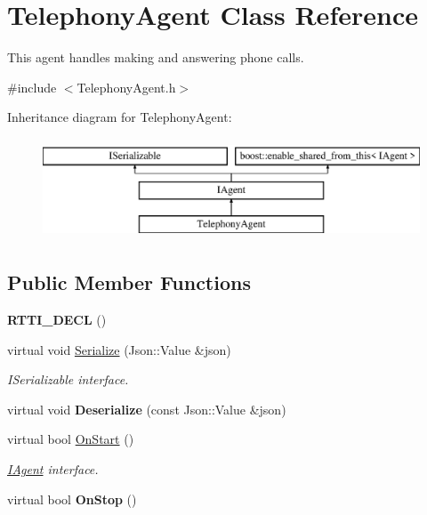 \hypertarget{class_telephony_agent}{}\section{Telephony\+Agent Class Reference}
\label{class_telephony_agent}


This agent handles making and answering phone calls.  




{\ttfamily \#include $<$Telephony\+Agent.\+h$>$}

Inheritance diagram for Telephony\+Agent\+:\begin{figure}[H]
\begin{center}
\leavevmode
\includegraphics[height=3.000000cm]{class_telephony_agent}
\end{center}
\end{figure}
\subsection*{Public Member Functions}
\begin{DoxyCompactItemize}
\item 
\mbox{\label{class_telephony_agent_a850b9b66618ba5754608eab6becd8de6}} 
{\bfseries R\+T\+T\+I\+\_\+\+D\+E\+CL} ()
\item 
\mbox{\label{class_telephony_agent_a52ecf2a6922d88291669cc99409781dc}} 
virtual void \hyperlink{class_telephony_agent_a52ecf2a6922d88291669cc99409781dc}{Serialize} (Json\+::\+Value \&json)
\begin{DoxyCompactList}\small\item\em I\+Serializable interface. \end{DoxyCompactList}\item 
\mbox{\label{class_telephony_agent_a762befed86fc28035dcced8945b5a16b}} 
virtual void {\bfseries Deserialize} (const Json\+::\+Value \&json)
\item 
virtual bool \hyperlink{class_telephony_agent_a65529f3187ba02917a868595599ad0c2}{On\+Start} ()
\begin{DoxyCompactList}\small\item\em \hyperlink{class_i_agent}{I\+Agent} interface. \end{DoxyCompactList}\item 
\mbox{\label{class_telephony_agent_ae1e36f56ce02303ffe484a5aae55a16a}} 
virtual bool {\bfseries On\+Stop} ()
\end{DoxyCompactItemize}
